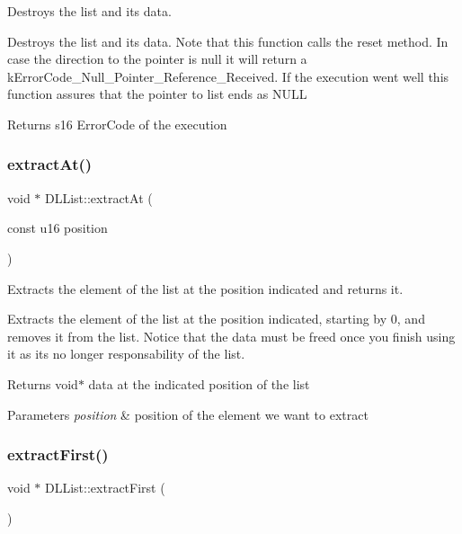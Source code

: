 Destroys the list and it\textquotesingle{}s data. 

Destroys the list and its data. Note that this function calls the reset method. In case the direction to the pointer is null it will return a k\+Error\+Code\+\_\+\+Null\+\_\+\+Pointer\+\_\+\+Reference\+\_\+\+Received. If the execution went well this function assures that the pointer to list ends as N\+U\+LL

\begin{DoxyReturn}{Returns}
s16 Error\+Code of the execution 
\end{DoxyReturn}
\mbox{\label{class_d_l_list_a026e0208727f84a6a4781966bf6a21da}} 
\subsubsection{\texorpdfstring{extract\+At()}{extractAt()}}
{\footnotesize\ttfamily void $\ast$ D\+L\+List\+::extract\+At (\begin{DoxyParamCaption}\item[{const u16}]{position }\end{DoxyParamCaption})}



Extracts the element of the list at the position indicated and returns it. 

Extracts the element of the list at the position indicated, starting by 0, and removes it from the list. Notice that the data must be freed once you finish using it as it\textquotesingle{}s no longer responsability of the list.

\begin{DoxyReturn}{Returns}
void$\ast$ data at the indicated position of the list 
\end{DoxyReturn}

\begin{DoxyParams}{Parameters}
{\em position} & position of the element we want to extract \\
\hline
\end{DoxyParams}
\mbox{\label{class_d_l_list_a2ca9b602004ecf213e67092d367f6cfe}} 
\subsubsection{\texorpdfstring{extract\+First()}{extractFirst()}}
{\footnotesize\ttfamily void $\ast$ D\+L\+List\+::extract\+First (\begin{DoxyParamCaption}{ }\end{DoxyParamCaption})}



